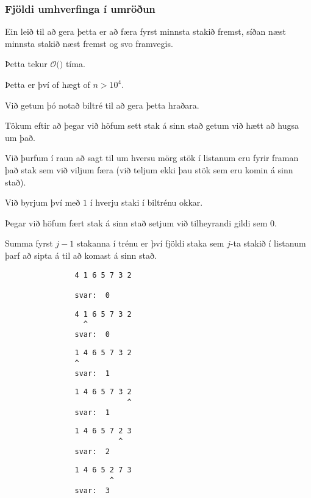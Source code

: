 {
	\frametitle{Fjöldi umhverfinga í umröðun}
	{
		\item<1-> Ein leið til að gera þetta er að færa fyrst minnsta stakið fremst, síðan næst minnsta stakið næst fremst og svo framvegis.
		\item<2-> Þetta tekur $\mathcal{O}($$)$ tíma.
		\item<4-> Þetta er því of hægt of $n > 10^4$.
		\item<5-> Við getum þó notað biltré til að gera þetta hraðara.
		\item<6-> Tökum eftir að þegar við höfum sett stak á sinn stað getum við hætt að hugsa um það.
		\item<7-> Við þurfum í raun að sagt til um hversu mörg stök í listanum eru fyrir framan það stak sem við viljum færa
					(við teljum ekki þau stök sem eru komin á sinn stað).
		\item<8-> Við byrjum því með $1$ í hverju staki í biltrénu okkar.
		\item<9-> Þegar við höfum fært stak á sinn stað setjum við tilheyrandi gildi sem $0$.
		\item<10-> Summa fyrst $j - 1$ stakanna í trénu er því fjöldi staka sem $j$-ta stakið í listanum þarf að sipta á til að komast á sinn stað.
	}
}
{ \begin{verbatim}
                4 1 6 5 7 3 2

                svar:  0
\end{verbatim}}
{ \begin{verbatim}
                4 1 6 5 7 3 2
                  ^
                svar:  0
\end{verbatim}}
{ \begin{verbatim}
                1 4 6 5 7 3 2
                ^
                svar:  1
\end{verbatim}}
{ \begin{verbatim}
                1 4 6 5 7 3 2
                            ^
                svar:  1
\end{verbatim}}
{ \begin{verbatim}
                1 4 6 5 7 2 3
                          ^
                svar:  2
\end{verbatim}}
{ \begin{verbatim}
                1 4 6 5 2 7 3
                        ^
                svar:  3
\end{verbatim}}
